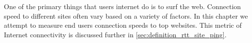 One of the primary things that users internet do is to surf the web. Connection speed to different sites often vary based on a variety of factors. In this chapter we attempt to measure end users connection speeds to top websites. This metric of Internet connectivity is discussed further in \cref{sec:definition_rtt_site_ping}.